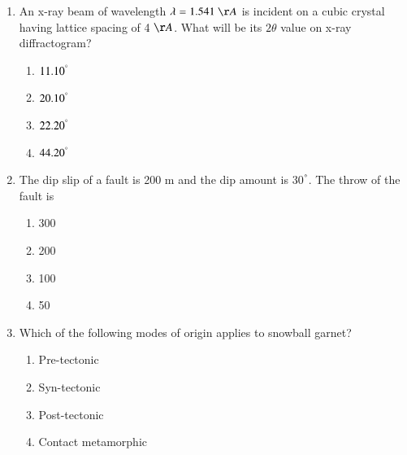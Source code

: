 \documentclass[journal,12pt,onecolumn]{IEEEtran}
\theoremstyle{remark}
\begin{document}
\begin{enumerate}
\newpage

    \item An x-ray beam of wavelength $\lambda=1.541~\AA$ is incident on a cubic crystal having lattice spacing of 4 $\AA$. What will be its $2\theta$ value  on x-ray diffractogram?

    \hfill{}
    
    \begin{multicols}{2}
        \begin{enumerate}
            \item $11.10^{\degree}$
            \item $20.10^{\degree}$
            \item $22.20^{\degree}$
            \item $44.20^{\degree}$
        \end{enumerate}
    \end{multicols}

    \item The dip slip of a fault is 200 m and the dip amount is 30$^{\degree}$. The throw of the fault  is

    \hfill{}
    
    \begin{multicols}{4}
        \begin{enumerate}
            \item 300
            \item 200
            \item 100
            \item 50
        \end{enumerate}
    \end{multicols}

    \item Which of the following modes of origin applies to snowball garnet?

    \hfill{}
    
    \begin{multicols}{2}
        \begin{enumerate}
            \item Pre-tectonic
            \item Syn-tectonic
            \item Post-tectonic
            \item Contact metamorphic
        \end{enumerate}
    \end{multicols}


\end{enumerate}
\end{document}
